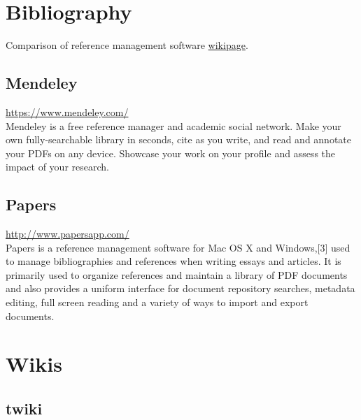 \documentclass{article}
\begin{document}
\section{Bibliography}
Comparison of reference management software \href{https://en.wikipedia.org/wiki/Comparison_of_reference_management_software}{wikipage}. 

\subsection{Mendeley}
\href{https://www.mendeley.com/}{https://www.mendeley.com/}\\
Mendeley is a free reference manager and academic social network. Make your own fully-searchable library in seconds, cite as you write, and read and annotate your PDFs on any device. Showcase your work on your profile and assess the impact of your research. 

\subsection{Papers}
\href{http://www.papersapp.com/}{http://www.papersapp.com/}\\
Papers is a reference management software for Mac OS X and Windows,[3] used to manage bibliographies and references when writing essays and articles. It is primarily used to organize references and maintain a library of PDF documents and also provides a uniform interface for document repository searches, metadata editing, full screen reading and a variety of ways to import and export documents.



\section{Wikis}
\subsection{twiki}
\end{document}
